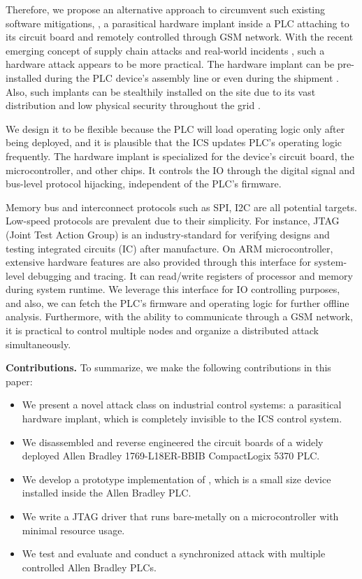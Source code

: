 
Therefore, we propose an alternative approach to circumvent such existing software mitigations, \name, a parasitical hardware implant inside a PLC attaching to its circuit board and remotely controlled through GSM network.  With the recent emerging concept of supply chain attacks and real-world incidents \cite{oxfordsolarwinds}, such a hardware attack appears to be more practical. The hardware implant can be pre-installed during the PLC device's assembly line or even during the shipment \cite{robertson2018big}. Also, such implants can be stealthily installed on the site due to its vast distribution and low physical security throughout the grid \cite{Loopholes2020}.


We design it to be flexible because the PLC will load operating logic only after being deployed, and it is plausible that the ICS updates PLC's operating logic frequently. The hardware implant is specialized for the device's circuit board, the microcontroller, and other chips.  It controls the IO through the digital signal and bus-level protocol hijacking, independent of the PLC's firmware.

Memory bus and interconnect protocols such as SPI, I2C are all potential targets. Low-speed protocols are prevalent due to their simplicity. For instance, JTAG (Joint Test Action Group) is an industry-standard for verifying designs and testing integrated circuits (IC) after manufacture. On ARM microcontroller, extensive hardware features are also provided through this interface for system-level debugging and tracing. It can read/write registers of processor and memory during system runtime. We leverage this interface for IO controlling purposes, and also, we can fetch the PLC's firmware and operating logic for further offline analysis. Furthermore, with the ability to communicate through a GSM network, it is practical to control multiple nodes and organize a distributed attack simultaneously.



\textbf{Contributions.} To summarize, we make the following contributions in this paper:
\begin{itemize}[leftmargin=*]
	\item We present a novel attack class on industrial control systems: a parasitical hardware implant, which is completely invisible to the ICS control system.
	\item We disassembled and reverse engineered the circuit boards of a widely deployed Allen Bradley 1769-L18ER-BBIB CompactLogix 5370 PLC. 
	\item We develop a prototype implementation of \name, which is a small size device installed inside the Allen Bradley PLC. 
	\item We write a JTAG driver that runs bare-metally on a microcontroller with minimal resource usage.
	\item We test and evaluate \name and conduct a synchronized attack with multiple controlled Allen Bradley PLCs. 
\end{itemize}

